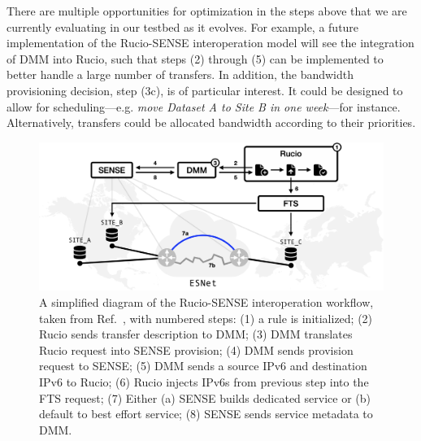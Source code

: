 There are multiple opportunities for optimization in the steps above that we are currently evaluating in our testbed as it evolves. 
For example, a future implementation of the Rucio-SENSE interoperation model will see the integration of DMM into Rucio, such that steps (2) through (5) can be implemented to better handle a large number of transfers.
In addition, the bandwidth provisioning decision, step (3c), is of particular interest. 
It could be designed to allow for scheduling---e.g. \textit{move Dataset A to Site B in one week}---for instance. 
Alternatively, transfers could be allocated bandwidth according to their priorities. 

\begin{figure}[htb]
    \centering
    \includegraphics[width=.9\textwidth]{fig/cyber/rucio-sense_basic.png}
    \caption[Rucio-SENSE interoperation workflow.]{
        A simplified diagram of the Rucio-SENSE interoperation workflow, taken from Ref.~\cite{Guiang:2022tgi}, with numbered steps: 
        (1) a rule is initialized; 
        (2) Rucio sends transfer description to DMM; 
        (3) DMM translates Rucio request into SENSE provision; 
        (4) DMM sends provision request to SENSE; 
        (5) DMM sends a source IPv6 and destination IPv6 to Rucio;
        (6) Rucio injects IPv6s from previous step into the FTS request;
        (7) Either (a) SENSE builds dedicated service or (b) default to best effort service; 
        (8) SENSE sends service metadata to DMM.
    }
    \label{fig:rucio_sense_basic}
\end{figure}


